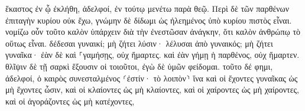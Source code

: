\documentclass{openreader}
\begin{document}
ἕκαστος ἐν ᾧ ἐκλήθη, ἀδελφοί, ἐν τούτῳ μενέτω παρὰ θεῷ. 
Περὶ δὲ τῶν παρθένων ἐπιταγὴν κυρίου οὐκ ἔχω, γνώμην δὲ δίδωμι ὡς ἠλεημένος ὑπὸ κυρίου πιστὸς εἶναι. 
νομίζω οὖν τοῦτο καλὸν ὑπάρχειν διὰ τὴν ἐνεστῶσαν ἀνάγκην, ὅτι καλὸν ἀνθρώπῳ τὸ οὕτως εἶναι. 
δέδεσαι γυναικί; μὴ ζήτει λύσιν· λέλυσαι ἀπὸ γυναικός; μὴ ζήτει γυναῖκα· 
ἐὰν δὲ καὶ ⸀γαμήσῃς, οὐχ ἥμαρτες. καὶ ἐὰν γήμῃ ἡ παρθένος, οὐχ ἥμαρτεν. θλῖψιν δὲ τῇ σαρκὶ ἕξουσιν οἱ τοιοῦτοι, ἐγὼ δὲ ὑμῶν φείδομαι. 
τοῦτο δέ φημι, ἀδελφοί, ὁ καιρὸς συνεσταλμένος ⸂ἐστίν· τὸ λοιπὸν⸃ ἵνα καὶ οἱ ἔχοντες γυναῖκας ὡς μὴ ἔχοντες ὦσιν, 
καὶ οἱ κλαίοντες ὡς μὴ κλαίοντες, καὶ οἱ χαίροντες ὡς μὴ χαίροντες, καὶ οἱ ἀγοράζοντες ὡς μὴ κατέχοντες, 
\end{document}
